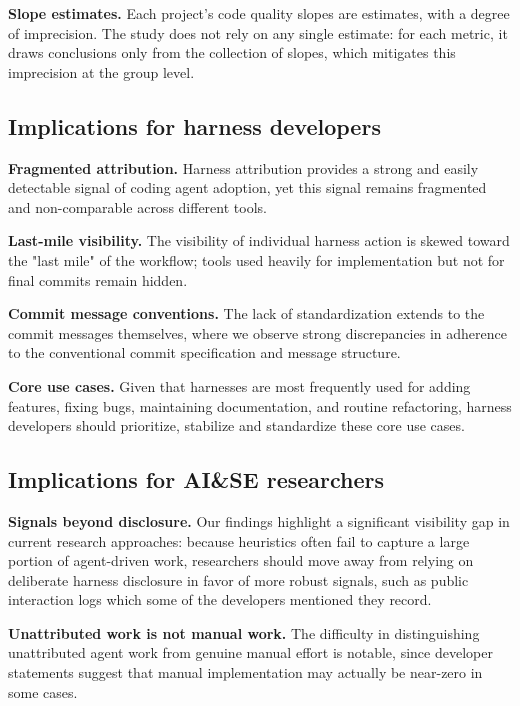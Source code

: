 \documentclass[smallextended]{svjour3}
\begin{document}
\textbf{Slope estimates.} Each project's code quality slopes are estimates, with a degree of imprecision. The study does not rely on any single estimate: for each metric, it draws conclusions only from the collection of slopes, which mitigates this imprecision at the group level.





\subsection{Implications for harness developers}

\textbf{Fragmented attribution.} Harness attribution provides a strong and easily detectable signal of coding agent adoption, yet this signal remains fragmented and non-comparable across different tools.

\textbf{Last-mile visibility.} The visibility of individual harness action is skewed toward the "last mile" of the workflow; tools used heavily for implementation but not for final commits remain hidden.

\textbf{Commit message conventions.} The lack of standardization extends to the commit messages themselves, where we observe strong discrepancies in adherence to the conventional commit specification and message structure.

\textbf{Core use cases.} Given that harnesses are most frequently used for adding features, fixing bugs, maintaining documentation, and routine refactoring, harness developers should prioritize, stabilize and standardize these core use cases.

\subsection{Implications for AI\&SE researchers}

\textbf{Signals beyond disclosure.} Our findings highlight a significant visibility gap in current research approaches: because heuristics often fail to capture a large portion of agent-driven work, researchers should move away from relying on deliberate harness disclosure in favor of more robust signals, such as public interaction logs which some of the developers mentioned they record.

\textbf{Unattributed work is not manual work.} The difficulty in distinguishing unattributed agent work from genuine manual effort is notable, since developer statements suggest that manual implementation may actually be near-zero in some cases.
\end{document}
